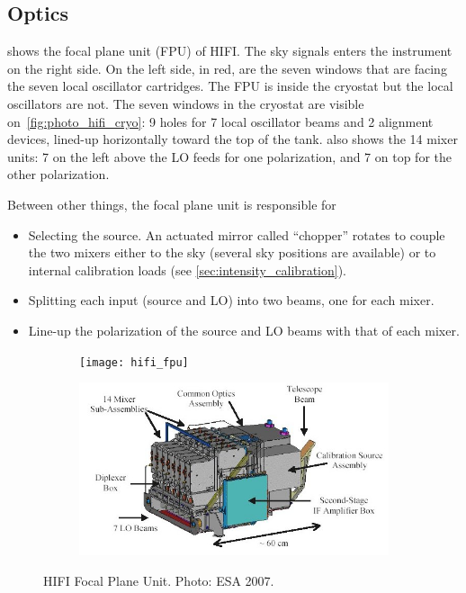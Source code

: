 \subsection{Optics}

 shows the focal plane unit (FPU) of HIFI.
The sky signals enters the instrument on the right side.
On the left side, in red, are the seven windows that are facing the seven local oscillator cartridges.
The FPU is inside the cryostat but the local oscillators are not.
The seven windows in the cryostat are visible on~\cref{fig:photo_hifi_cryo}: 9 holes for 7 local oscillator beams and 2 alignment devices, lined-up horizontally toward the top of the tank.
 also shows the 14 mixer units: 7 on the left above the LO feeds for one polarization, and 7 on top for the other polarization.

\begin{samepage}
Between other things, the focal plane unit is responsible for
\begin{itemize}[nolistsep,noitemsep]
    \item Selecting the source.  An actuated mirror called ``chopper'' rotates to couple the two mixers either to the sky (several sky positions are available) or to internal calibration loads (see \cref{sec:intensity_calibration}).
    \item Splitting each input (source and LO) into two beams, one for each mixer.
    \item Line-up the polarization of the source and LO beams with that of each mixer.
\end{itemize}
\end{samepage}

\begin{figure}
    \centering
    \begin{subfigure}[c]{.4\textwidth}
        \texttt{[image: hifi\_fpu]}
    \end{subfigure}%
    \begin{subfigure}[c]{.6\textwidth}
        \includegraphics[width=\textwidth]{hifi_fpu_schematic}
    \end{subfigure}
    \caption{HIFI Focal Plane Unit.  Photo: ESA 2007.}
    \label{fig:photo_hifi_fpu}
\end{figure}

